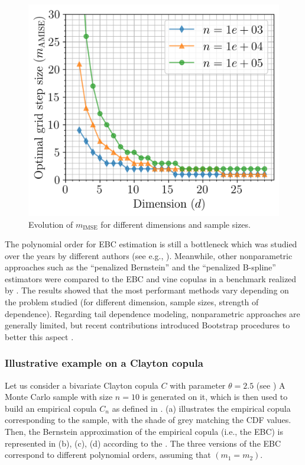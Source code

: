 \begin{figure}
    \centering
    \includegraphics[width=0.5\linewidth]{../numerical_experiments/chapter3/figures/hAMISE.png}
    \caption{Evolution of $m_{\mathrm{IMSE}}$ for different dimensions and sample sizes.}
    \label{fig:hmise}
\end{figure}

The polynomial order for EBC estimation is still a bottleneck which was studied over the years by different authors (see e.g., \citealt{janssen_2012_ebc,bouezmarni_2013_EBC_convergence,rose_2015,segers_2017}).  
Meanwhile, other nonparametric approaches such as the ``penalized Bernstein'' and the ``penalized B-spline'' estimators were compared to the EBC and vine copulas in a benchmark realized by \citet{nagler_2017}. 
The results showed that the most performant methods vary depending on the problem studied (for different dimension, sample sizes, strength of dependence). 
Regarding tail dependence modeling, nonparametric approaches are generally limited, but recent contributions introduced Bootstrap procedures to better this aspect \citep{kiriliouk_2021_resampling}.


\subsubsection{Illustrative example on a Clayton copula}
Let us consider a bivariate Clayton copula $C$ with parameter $\theta=2.5$ (see \citealt{nelsen_2006_copulas})
A Monte Carlo sample with size $n=10$ is generated on it, which is then used to build an empirical copula $C_n$ as defined in . 
 (a) illustrates the empirical copula corresponding to the sample, with the shade of grey matching the CDF values. 
Then, the Bernstein approximation of the empirical copula (i.e., the EBC)  is represented in  (b), (c), (d) according to the . 
The three versions of the EBC correspond to different polynomial orders, assuming that $(m_1=m_2)$. 

